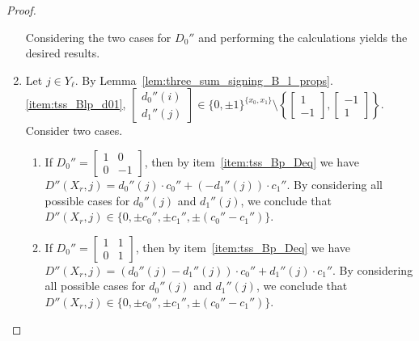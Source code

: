 \begin{proof}
\begin{enumerate}
\[        \]
        Considering the two cases for $D_{0}''$ and performing the calculations yields the desired results.

        \item Let $j \in Y_{\ell}$. By Lemma~\ref{lem:three_sum_signing_B_l_props}.\ref{item:tss_Blp_d01}, $\begin{bmatrix} d_{0}'' (i) \\ d_{1}'' (j) \end{bmatrix} \in \{0, \pm 1\}^{\{x_{0}, x_{1}\}} \setminus \left\{ \begin{bmatrix} 1 \\ -1 \end{bmatrix}, \begin{bmatrix} -1 \\ 1 \end{bmatrix} \right\}$. Consider two cases.
        \begin{enumerate}
            \item If $D_{0}'' = \begin{bmatrix} 1 & 0 \\ 0 & -1 \end{bmatrix}$, then by item~\ref{item:tss_Bp_Deq} we have $D'' (X_{r}, j) = d_{0}'' (j) \cdot c_{0}''  + (-d_{1}'' (j)) \cdot c_{1}''$. By considering all possible cases for $d_{0}'' (j)$ and $d_{1}'' (j)$, we conclude that $D'' (X_{r}, j) \in \{0, \pm c_{0}'', \pm c_{1}'', \pm (c_{0}'' - c_{1}'')\}$.
            \item If $D_{0}'' = \begin{bmatrix} 1 & 1 \\ 0 & 1 \end{bmatrix}$, then by item~\ref{item:tss_Bp_Deq} we have $D'' (X_{r}, j) = (d_{0}'' (j) - d_{1}'' (j)) \cdot c_{0}''  + d_{1}'' (j) \cdot c_{1}''$. By considering all possible cases for $d_{0}'' (j)$ and $d_{1}'' (j)$, we conclude that $D'' (X_{r}, j) \in \{0, \pm c_{0}'', \pm c_{1}'', \pm (c_{0}'' - c_{1}'')\}$.
        \end{enumerate}


\end{enumerate}
\end{proof}
